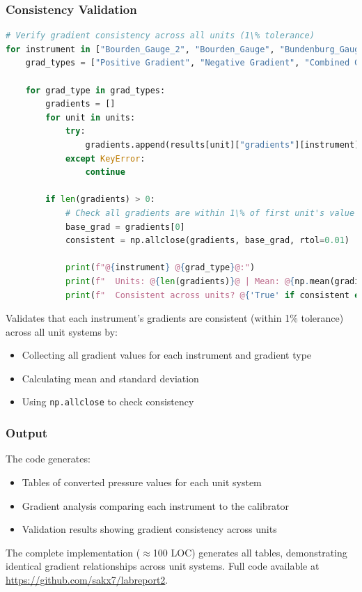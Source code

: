 \documentclass{article}
\begin{document}
\subsubsection{Consistency Validation}
\begin{lstlisting}[language=Python,escapechar=@]
# Verify gradient consistency across all units (1\% tolerance)
for instrument in ["Bourden_Gauge_2", "Bourden_Gauge", "Bundenburg_Gauge", "Hg_Glass"]:
	grad_types = ["Positive Gradient", "Negative Gradient", "Combined Gradient"]

	for grad_type in grad_types:
		gradients = []
		for unit in units:
			try:
				gradients.append(results[unit]["gradients"][instrument][grad_type])
			except KeyError:
				continue
	
		if len(gradients) > 0:
			# Check all gradients are within 1\% of first unit's value
			base_grad = gradients[0]
			consistent = np.allclose(gradients, base_grad, rtol=0.01)
		
			print(f"@{instrument} @{grad_type}@:")
			print(f"  Units: @{len(gradients)}@ | Mean: @{np.mean(gradients):.4f}@ $\pm$ @{np.std(gradients):.4f}@")
			print(f"  Consistent across units? @{'True' if consistent else 'False'}@")
\end{lstlisting}

Validates that each instrument's gradients are consistent (within 1\% tolerance) across all unit systems by:
\begin{itemize}
	\item Collecting all gradient values for each instrument and gradient type
	\item Calculating mean and standard deviation
	\item Using \texttt{np.allclose} to check consistency
\end{itemize}

\subsubsection{Output}
The code generates:
\begin{itemize}
	\item Tables of converted pressure values for each unit system
	\item Gradient analysis comparing each instrument to the calibrator
	\item Validation results showing gradient consistency across units
\end{itemize}

\vspace{1em}
The complete implementation ($\approx$100 LOC) generates all tables, demonstrating identical gradient relationships across unit systems. Full code available at \url{https://github.com/sakx7/labreport2}.
\end{document}

